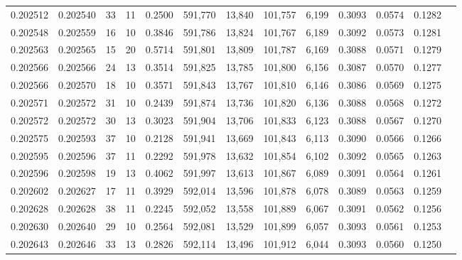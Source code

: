 \begin{tabular}{rrrrrrrrrrrrr}
0.202512 & 0.202540 &    33 &  11 &                                     0.2500 & 591,770 &  13,840 & 101,757 &   6,199 & 0.3093 & 0.0574 & 0.1282 \\
0.202548 & 0.202559 &    16 &  10 &                                     0.3846 & 591,786 &  13,824 & 101,767 &   6,189 & 0.3092 & 0.0573 & 0.1281 \\
0.202563 & 0.202565 &    15 &  20 &                                     0.5714 & 591,801 &  13,809 & 101,787 &   6,169 & 0.3088 & 0.0571 & 0.1279 \\
0.202566 & 0.202566 &    24 &  13 &                                     0.3514 & 591,825 &  13,785 & 101,800 &   6,156 & 0.3087 & 0.0570 & 0.1277 \\
0.202566 & 0.202570 &    18 &  10 &                                     0.3571 & 591,843 &  13,767 & 101,810 &   6,146 & 0.3086 & 0.0569 & 0.1275 \\
0.202571 & 0.202572 &    31 &  10 &                                     0.2439 & 591,874 &  13,736 & 101,820 &   6,136 & 0.3088 & 0.0568 & 0.1272 \\
0.202572 & 0.202572 &    30 &  13 &                                     0.3023 & 591,904 &  13,706 & 101,833 &   6,123 & 0.3088 & 0.0567 & 0.1270 \\
0.202575 & 0.202593 &    37 &  10 &                                     0.2128 & 591,941 &  13,669 & 101,843 &   6,113 & 0.3090 & 0.0566 & 0.1266 \\
0.202595 & 0.202596 &    37 &  11 &                                     0.2292 & 591,978 &  13,632 & 101,854 &   6,102 & 0.3092 & 0.0565 & 0.1263 \\
0.202596 & 0.202598 &    19 &  13 &                                     0.4062 & 591,997 &  13,613 & 101,867 &   6,089 & 0.3091 & 0.0564 & 0.1261 \\
0.202602 & 0.202627 &    17 &  11 &                                     0.3929 & 592,014 &  13,596 & 101,878 &   6,078 & 0.3089 & 0.0563 & 0.1259 \\
0.202628 & 0.202628 &    38 &  11 &                                     0.2245 & 592,052 &  13,558 & 101,889 &   6,067 & 0.3091 & 0.0562 & 0.1256 \\
0.202630 & 0.202640 &    29 &  10 &                                     0.2564 & 592,081 &  13,529 & 101,899 &   6,057 & 0.3093 & 0.0561 & 0.1253 \\
0.202643 & 0.202646 &    33 &  13 &                                     0.2826 & 592,114 &  13,496 & 101,912 &   6,044 & 0.3093 & 0.0560 & 0.1250 \\

\end{tabular}
